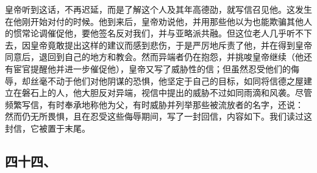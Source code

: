 皇帝听到这话，不再迟延，而是了解这个人及其年高德劭，就写信召见他。这发生在他刚开始对付的时候。他到来后，皇帝劝说他，并用那些他以为也能欺骗其他人的惯常论调催促他，要他签名反对我们，并与亚略派共融。但这位老人几乎听不下去，因皇帝竟敢提出这样的建议而感到悲伤，于是严厉地斥责了他，并在得到皇帝同意后，退回到自己的地方和教会。然而异端者仍在抱怨，并挑唆皇帝继续（他还有宦官提醒他并进一步催促他），皇帝又写了威胁性的信；但虽然忍受他们的侮辱，却丝毫不动于他们对他阴谋的恐惧，他坚定于自己的目标，如同将信德之屋建立在磐石上的人，他大胆反对异端，视信中提出的威胁不过如同雨滴和风袭。尽管频繁写信，有时奉承地称他为父，有时威胁并列举那些被流放者的名字，还说： 然而仍无所畏惧，且在忍受这些侮辱期间，写了一封回信，内容如下。我们读过这封信，它被置于末尾。\par


\subsection{四十四、}

